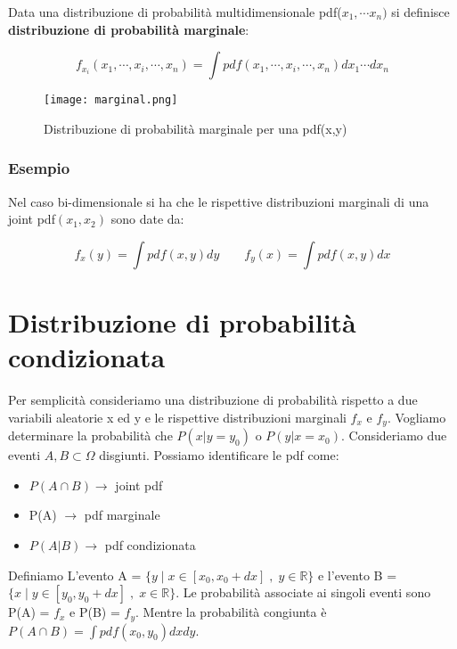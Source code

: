 \documentclass[11pt,a4paper]{book}
\begin{document}
Data una distribuzione di probabilit\`{a} multidimensionale pdf($x_1,\cdots x_n)$ si definisce \textbf{distribuzione di probabilit\`{a} marginale}:

\begin{equation}
	f_{x_i}(x_1, \cdots,x_{i},\cdots,x_n) = \int pdf(x_1,\cdots,x_i,\cdots,x_n)dx_1\cdots dx_n
\end{equation}

 
\begin{figure}[ht]
\vspace{0.in}
\texttt{[image: marginal.png]}	
\centering
\vspace{0.in}
\caption{Distribuzione di probabilit\`{a} marginale per una pdf(x,y)}
\end{figure}

\subsubsection{Esempio}

Nel caso bi-dimensionale si ha che le rispettive distribuzioni marginali di una joint pdf$(x_1,x_2)$ sono date da:

\begin{equation}
	f_x(y) = \int pdf(x,y)dy \quad  \quad f_y(x) = \int pdf(x,y)dx
\end{equation}


\section{Distribuzione di probabilit\`{a} condizionata}

Per semplicit\`{a} consideriamo una distribuzione di probabilit\`{a} rispetto a due variabili aleatorie x ed y e le rispettive distribuzioni marginali $f_x$ e $f_y$. Vogliamo determinare la  probabilit\`{a} che $P(x \vert y = y_0)$ o $P(y \vert x = x_0) $. Consideriamo due eventi $A,B \subset \Omega$ disgiunti. Possiamo identificare le pdf come:

\begin{itemize}
	\item $P(A \cap B) \rightarrow $ joint pdf
	\item P(A) $\rightarrow$ pdf marginale
	\item $P(A|B) \rightarrow $ pdf condizionata
\end{itemize}

\noindent Definiamo L'evento A = $\{ y \; \vert \; x \in [x_0,x_0 +dx]\;,\; y \in \mathbb{R} \} $ e l'evento B = $\{ x \; \vert \; y \in [y_0,y_0 +dx]\;,\; x \in \mathbb{R} \} $. Le probabilit\`{a} associate ai singoli eventi sono P(A) = $f_x$ e P(B) = $f_y$. Mentre la probabilit\`{a} congiunta \`{e} $P(A \cap B) = \int pdf(x_0,y_0)dxdy$. 
\end{document}
